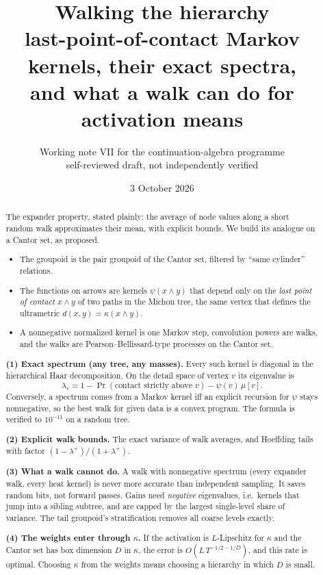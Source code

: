 \documentclass[11pt]{article}
\title{Walking the hierarchy\\[4pt]
\large last-point-of-contact Markov kernels, their exact spectra,\\ and what a walk can do for activation means}
\author{Working note VII for the continuation-algebra programme\\
\small self-reviewed draft, not independently verified}
\date{3 October 2026}
\theoremstyle{definition}
\theoremstyle{remark}
\begin{document}
\maketitle

\begin{abstract}
The expander property, stated plainly: the average of node values along a short random walk approximates their mean, with explicit bounds. We build its analogue on a Cantor set, as proposed.
\begin{itemize}
\item The groupoid is the pair groupoid of the Cantor set, filtered by ``same cylinder'' relations.
\item The functions on arrows are kernels $\psi(x\wedge y)$ that depend only on the \emph{last point of contact} $x\wedge y$ of two paths in the Michon tree, the same vertex that defines the ultrametric $d(x,y)=\kappa(x\wedge y)$.
\item A nonnegative normalized kernel is one Markov step, convolution powers are walks, and the walks are Pearson--Bellissard-type processes on the Cantor set.
\end{itemize}

\textbf{(1) Exact spectrum (any tree, any masses).} Every such kernel is diagonal in the hierarchical Haar decomposition. On the detail space of vertex $v$ its eigenvalue is
\[\lambda_v=1-\Pr(\text{contact strictly above }v)-\psi(v)\,\mu[v].\]
Conversely, a spectrum comes from a Markov kernel iff an explicit recursion for $\psi$ stays nonnegative, so the best walk for given data is a convex program. The formula is verified to $10^{-11}$ on a random tree.

\textbf{(2) Explicit walk bounds.} The exact variance of walk averages, and Hoeffding tails with factor $(1-\lambda^+)/(1+\lambda^+)$.

\textbf{(3) What a walk cannot do.} A walk with nonnegative spectrum (every expander walk, every heat kernel) is never more accurate than independent sampling. It saves random bits, not forward passes. Gains need \emph{negative} eigenvalues, i.e.\ kernels that jump into a sibling subtree, and are capped by the largest single-level share of variance. The tail groupoid's stratification removes all coarse levels exactly.

\textbf{(4) The weights enter through $\kappa$.} If the activation is $L$-Lipschitz for $\kappa$ and the Cantor set has box dimension $D$ in $\kappa$, the error is $O(L\,T^{-1/2-1/D})$, and this rate is optimal. Choosing $\kappa$ from the weights means choosing a hierarchy in which $D$ is small.


\end{abstract}
\end{document}
